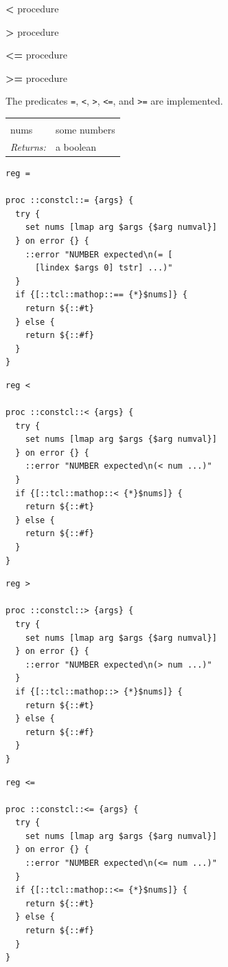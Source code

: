 \documentclass[twoside]{report}
\begin{document}
\noindent \textbf{<} procedure

\noindent \textbf{>} procedure

\noindent \textbf{<=} procedure

\noindent \textbf{>=} procedure

The predicates \texttt{=}, \texttt{<}, \texttt{>}, \texttt{<=}, and \texttt{>=} are implemented.

\noindent\begin{tabular}{ |p{1.9cm} p{8cm}| }
\hline
\rowcolor[HTML]{CCCCCC} \multicolumn{2}{|l|}{\bf =, <, >, <=, >= (public)} \\
nums & some numbers \\
\textit{Returns:} & a boolean \\
\hline
\end{tabular}

\begin{lstlisting}
reg =

proc ::constcl::= {args} {
  try {
    set nums [lmap arg $args {$arg numval}]
  } on error {} {
    ::error "NUMBER expected\n(= [
      [lindex $args 0] tstr] ...)"
  }
  if {[::tcl::mathop::== {*}$nums]} {
    return ${::#t}
  } else {
    return ${::#f}
  }
}
\end{lstlisting}

\begin{lstlisting}
reg <

proc ::constcl::< {args} {
  try {
    set nums [lmap arg $args {$arg numval}]
  } on error {} {
    ::error "NUMBER expected\n(< num ...)"
  }
  if {[::tcl::mathop::< {*}$nums]} {
    return ${::#t}
  } else {
    return ${::#f}
  }
}
\end{lstlisting}

\begin{lstlisting}
reg >

proc ::constcl::> {args} {
  try {
    set nums [lmap arg $args {$arg numval}]
  } on error {} {
    ::error "NUMBER expected\n(> num ...)"
  }
  if {[::tcl::mathop::> {*}$nums]} {
    return ${::#t}
  } else {
    return ${::#f}
  }
}
\end{lstlisting}

\begin{lstlisting}
reg <=

proc ::constcl::<= {args} {
  try {
    set nums [lmap arg $args {$arg numval}]
  } on error {} {
    ::error "NUMBER expected\n(<= num ...)"
  }
  if {[::tcl::mathop::<= {*}$nums]} {
    return ${::#t}
  } else {
    return ${::#f}
  }
}
\end{lstlisting}
\end{document}
